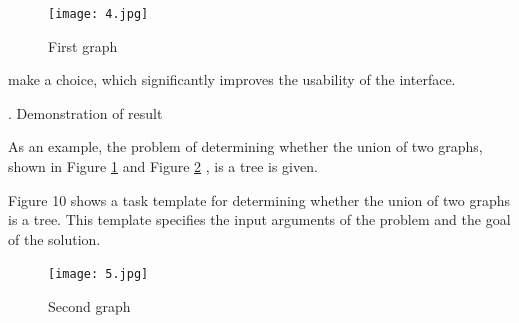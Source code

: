 \documentclass[a4paper]{article}
\newcommand{\RomanNumeralCaps}[1]
    {\MakeUppercase{\romannumeral #1}}
\begin{document}
\begin{multicols}{2}
\begin{justify}
\begin{figure}[H]
 \end{figure}\vspace{-20pt}
\begin{figure}[H]
    \centering
    \texttt{[image: 4.jpg]} 
    \caption{ First graph\label{8}}
 \end{figure}\vspace{-20pt}
make a choice, which significantly improves the usability
of the interface.\vspace{-20pt}
\begin{center}
    \RomanNumeralCaps{6.} Demonstration of result
\end{center}\vspace{-20pt}As an example, the problem of determining whether
the union of two graphs, shown in Figure \ref{8} and Figure \ref{9} ,
is a tree is given.\par Figure 10 shows a task template for determining
whether the union of two graphs is a tree. This template
specifies the input arguments of the problem and the goal
of the solution.
\begin{figure}[H]
    \centering
    \texttt{[image: 5.jpg]}
    \caption{Second graph\label{9}}
 \end{figure}
\hspace{2cm}
\hspace{10cm}
\end{justify}
\end{multicols}
\end{document}
